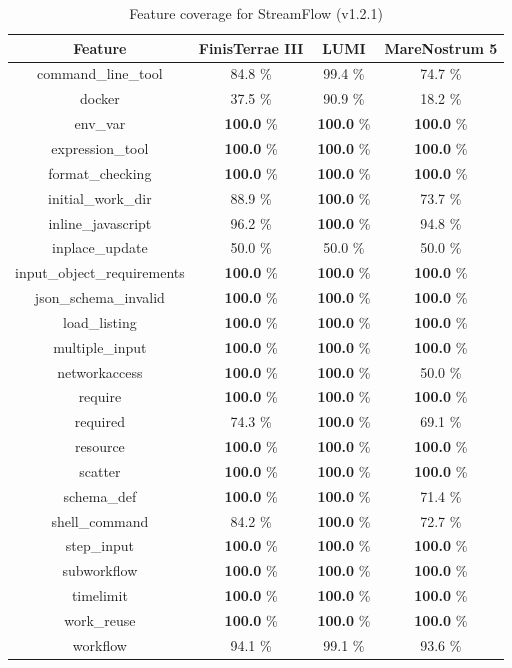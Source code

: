 \documentclass{article}
\begin{document}
\begin{table}[ht!]
\centering
\setlength{\tabcolsep}{6pt}
\renewcommand{\arraystretch}{1.2}
\begin{tabular}{|c|c|c|c|}
\hline
\rowcolor{lightgray!50}
\textbf{Feature} & \textbf{FinisTerrae III} & \textbf{LUMI} & \textbf{MareNostrum 5} \\
\hline
command\_line\_tool & 84.8 \% & 99.4 \% & 74.7 \% \\
docker & 37.5 \% & 90.9 \% & 18.2 \% \\
env\_var & \textbf{100.0} \% & \textbf{100.0} \% & \textbf{100.0} \% \\
expression\_tool & \textbf{100.0} \% & \textbf{100.0} \% & \textbf{100.0} \% \\
format\_checking & \textbf{100.0} \% & \textbf{100.0} \% & \textbf{100.0} \% \\
initial\_work\_dir & 88.9 \% & \textbf{100.0} \% & 73.7 \% \\
inline\_javascript & 96.2 \% & \textbf{100.0} \% & 94.8 \% \\
inplace\_update & 50.0 \% & 50.0 \% & 50.0 \% \\
input\_object\_requirements & \textbf{100.0} \% & \textbf{100.0} \% & \textbf{100.0} \% \\
json\_schema\_invalid & \textbf{100.0} \% & \textbf{100.0} \% & \textbf{100.0} \% \\
load\_listing & \textbf{100.0} \% & \textbf{100.0} \% & \textbf{100.0} \% \\
multiple\_input & \textbf{100.0} \% & \textbf{100.0} \% & \textbf{100.0} \% \\
networkaccess & \textbf{100.0} \% & \textbf{100.0} \% & 50.0 \% \\
require & \textbf{100.0} \% & \textbf{100.0} \% & \textbf{100.0} \% \\
required & 74.3 \% & \textbf{100.0} \% & 69.1 \% \\
resource & \textbf{100.0} \% & \textbf{100.0} \% & \textbf{100.0} \% \\
scatter & \textbf{100.0} \% & \textbf{100.0} \% & \textbf{100.0} \% \\
schema\_def & \textbf{100.0} \% & \textbf{100.0} \% & 71.4 \% \\
shell\_command & 84.2 \% & \textbf{100.0} \% & 72.7 \% \\
step\_input & \textbf{100.0} \% & \textbf{100.0} \% & \textbf{100.0} \% \\
subworkflow & \textbf{100.0} \% & \textbf{100.0} \% & \textbf{100.0} \% \\
timelimit & \textbf{100.0} \% & \textbf{100.0} \% & \textbf{100.0} \% \\
work\_reuse & \textbf{100.0} \% & \textbf{100.0} \% & \textbf{100.0} \% \\
workflow & 94.1 \% & 99.1 \% & 93.6 \% \\
\hline
\end{tabular}
\caption{Feature coverage for StreamFlow (v1.2.1)}
\label{tab:streamflow_feat_v12}
\end{table}
\clearpage
\end{document}
